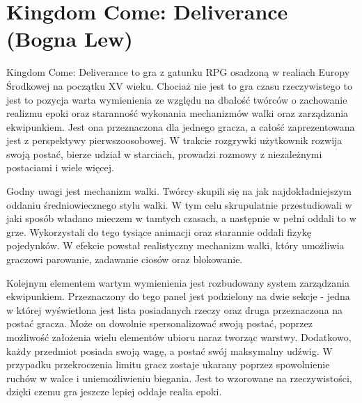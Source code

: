 \section{Kingdom Come: Deliverance (Bogna Lew)}

Kingdom Come: Deliverance to gra z gatunku RPG osadzoną w realiach Europy Środkowej na początku XV wieku. Chociaż nie
jest to gra czasu rzeczywistego to jest to pozycja warta wymienienia ze względu na dbałość twórców o zachowanie realizmu
epoki oraz staranność wykonania mechanizmów walki oraz zarządzania ekwipunkiem. Jest ona przeznaczona dla jednego gracza,
a całość zaprezentowana jest z perspektywy pierwszoosobowej. W trakcie rozgrywki użytkownik rozwija swoją postać, bierze
udział w starciach, prowadzi rozmowy z niezależnymi postaciami i wiele więcej.

Godny uwagi jest mechanizm walki. Twórcy skupili się na jak najdokładniejszym oddaniu średniowiecznego stylu walki. W tym
celu skrupulatnie przestudiowali w jaki sposób władano mieczem w tamtych czasach, a następnie w pełni oddali to w grze.
Wykorzystali do tego tysiące animacji oraz starannie oddali fizykę pojedynków. W efekcie powstał realistyczny mechanizm
walki, który umożliwia graczowi parowanie, zadawanie ciosów oraz blokowanie.

Kolejnym elementem wartym wymienienia jest rozbudowany system zarządzania ekwipunkiem. Przeznaczony do tego panel jest
podzielony na dwie sekcje - jedna w której wyświetlona jest lista posiadanych rzeczy oraz druga przeznaczona na postać
gracza. Może on dowolnie spersonalizować swoją postać, poprzez możliwość założenia wielu elementów ubioru naraz tworząc
warstwy.  Dodatkowo, każdy przedmiot posiada swoją wagę, a postać swój maksymalny udźwig. W przypadku przekroczenia limitu
gracz zostaje ukarany poprzez spowolnienie ruchów w walce i uniemożliwieniu biegania. Jest to wzorowane na rzeczywistości,
dzięki czemu gra jeszcze lepiej oddaje realia epoki.
